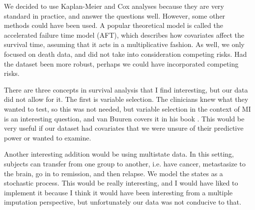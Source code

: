 We decided to use Kaplan-Meier and Cox analyses because they are very standard in practice, and answer the questions well. However, some other methods could have been used. A popular theoretical model is called the accelerated failure time model (AFT), which describes how covariates affect the survival time, assuming that it acts in a multiplicative fashion. As well, we only focused on death data, and did not take into consideration competing risks. Had the dataset been more robust, perhaps we could have incorporated competing risks.  
\begin{comment}
Next, since there is no well-established method to validate the model, we had to be creative and define our own methods to check them. The methods are reasonable and both the stacked and individual methods are very similar. More research should be done though to verify if this will always be the case, specifically in the presence of pathological data. 
We had some survival data in the dataset that would be appropriate for the competing risks setting, but this was not of primary concern to the clinicians. In future research, analyzing this data would be of interest since it poses many interesting problems.
\end{comment}

There are three concepts in survival analysis that I find interesting, but our data did not allow for it. The first is variable selection. The clinicians knew what they wanted to test, so this was not needed, but variable selection in the context of MI is an interesting question, and van Buuren covers it in his book \cite{VanBuuren2012}. This would be very useful if our dataset had covariates that we were unsure of their predictive power or wanted to examine. 

Another interesting addition would be using multistate data. In this setting, subjects can transfer from one group to another, i.e. have cancer, metastasize to the brain, go in to remission, and then relapse.  We model the states as a stochastic process. This would be really interesting, and I would have liked to implement it because I think it would have been interesting from a multiple imputation perspective, but unfortunately our data was not conducive to that.


